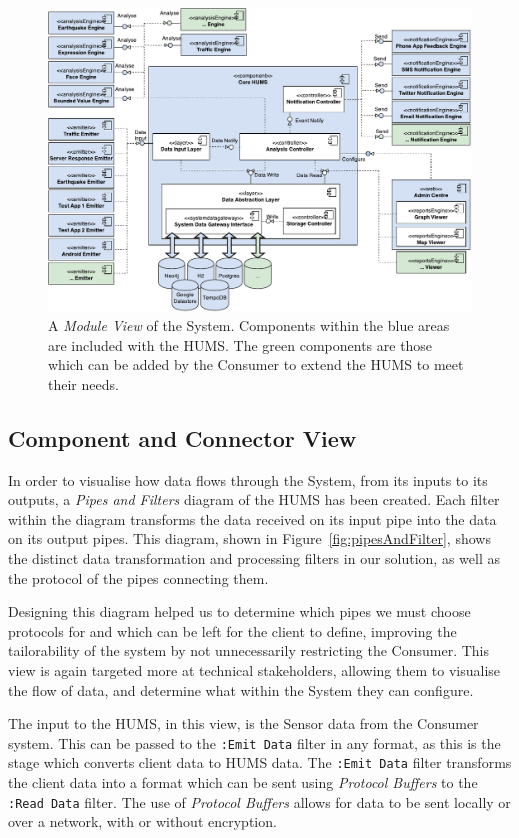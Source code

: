 \documentclass[10pt,a4paper]{article}
\begin{document}
\begin{figure}[t]
  \centering
  \includegraphics[width=\textwidth]{images/component.pdf}
  \caption{A \emph{Module View} of the System. Components within the blue areas are included with the HUMS. The green components are those which can be added by the Consumer to extend the HUMS to meet their needs.}
  \label{fig:modules}
\end{figure}

\subsection{Component and Connector View}
In order to visualise how data flows through the System, from its inputs to its outputs, a \emph{Pipes and Filters} diagram of the HUMS has been created. Each filter within the diagram transforms the data received on its input pipe into the data on its output pipes. This diagram, shown in Figure~\ref{fig:pipesAndFilter}, shows the distinct data transformation and processing filters in our solution, as well as the protocol of the pipes connecting them.

Designing this diagram helped us to determine which pipes we must choose protocols for and which can be left for the client to define, improving the tailorability of the system by not unnecessarily restricting the Consumer. This view is again targeted more at technical stakeholders, allowing them to visualise the flow of data, and determine what within the System they can configure.

The input to the HUMS, in this view, is the Sensor data from the Consumer system. This can be passed to the \texttt{:Emit Data} filter in any format, as this is the stage which converts client data to HUMS data. The \texttt{:Emit Data} filter transforms the client data into a format which can be sent using \emph{Protocol Buffers} to the \texttt{:Read Data} filter. The use of \emph{Protocol Buffers} allows for data to be sent locally or over a network, with or without encryption. 
\end{document}
